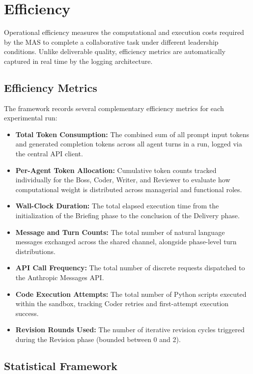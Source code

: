 \section{Efficiency}
\label{sec:eval-efficiency}

Operational efficiency measures the computational and execution costs required by the \ac{MAS} to complete a collaborative task under different leadership conditions.
Unlike deliverable quality, efficiency metrics are automatically captured in real time by the logging architecture.

\subsection{Efficiency Metrics}
\label{subsec:efficiency-metrics}

The framework records several complementary efficiency metrics for each experimental run:
\begin{itemize}
    \item \textbf{Total Token Consumption:} The combined sum of all prompt input tokens and generated completion tokens across all agent turns in a run, logged via the central \ac{API} client.
    \item \textbf{Per-Agent Token Allocation:} Cumulative token counts tracked individually for the Boss, Coder, Writer, and Reviewer to evaluate how computational weight is distributed across managerial and functional roles.
    \item \textbf{Wall-Clock Duration:} The total elapsed execution time from the initialization of the Briefing phase to the conclusion of the Delivery phase.
    \item \textbf{Message and Turn Counts:} The total number of natural language messages exchanged across the shared channel, alongside phase-level turn distributions.
    \item \textbf{\ac{API} Call Frequency:} The total number of discrete requests dispatched to the Anthropic Messages \ac{API}.
    \item \textbf{Code Execution Attempts:} The total number of Python scripts executed within the sandbox, tracking Coder retries and first-attempt execution success.
    \item \textbf{Revision Rounds Used:} The number of iterative revision cycles triggered during the Revision phase (bounded between 0 and 2).
\end{itemize}

\subsection{Statistical Framework}
\label{subsec:efficiency-statistical-framework}

